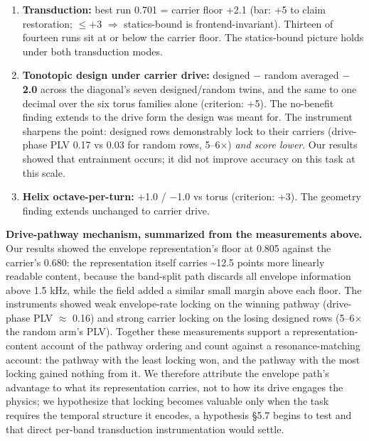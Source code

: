 \documentclass[10pt]{article}
\providecommand{\tightlist}{%
  \setlength{\itemsep}{0pt}\setlength{\parskip}{0pt}}
\begin{document}
\begin{enumerate}
\def\labelenumi{\arabic{enumi}.}
\tightlist
\item
  \textbf{Transduction:} best run 0.701 = carrier floor +2.1 (bar: +5 to
  claim restoration; \ensuremath{\leq}+3 \ensuremath{\Rightarrow}
  statics-bound is frontend-invariant). Thirteen of fourteen runs sit at
  or below the carrier floor. The statics-bound picture holds under both
  transduction modes.
\item
  \textbf{Tonotopic design under carrier drive:} designed \ensuremath{-}
  random averaged \textbf{\ensuremath{-}2.0} across the diagonal's seven
  designed/random twins, and the same to one decimal over the six torus
  families alone (criterion: +5). The no-benefit finding extends to the
  drive form the design was meant for. The instrument sharpens the
  point: designed rows demonstrably lock to their carriers (drive-phase
  PLV 0.17 vs 0.03 for random rows, 5--6\ensuremath{\times}) \emph{and
  score lower}. Our results showed that entrainment occurs; it did not
  improve accuracy on this task at this scale.
\item
  \textbf{Helix octave-per-turn:} +1.0 / \ensuremath{-}1.0 vs torus
  (criterion: +3). The geometry finding extends unchanged to carrier
  drive.
\end{enumerate}

\textbf{Drive-pathway mechanism, summarized from the measurements
above.} Our results showed the envelope representation's floor at 0.805
against the carrier's 0.680: the representation itself carries
\textasciitilde12.5 points more linearly readable content, because the
band-split path discards all envelope information above 1.5 kHz, while
the field added a similar small margin above each floor. The instruments
showed weak envelope-rate locking on the winning pathway (drive-phase
PLV \ensuremath{\approx} 0.16) and strong carrier locking on the losing
designed rows (5--6\ensuremath{\times} the random arm's PLV). Together
these measurements support a representation-content account of the
pathway ordering and count against a resonance-matching account: the
pathway with the least locking won, and the pathway with the most
locking gained nothing from it. We therefore attribute the envelope
path's advantage to what its representation carries, not to how its
drive engages the physics; we hypothesize that locking becomes valuable
only when the task requires the temporal structure it encodes, a
hypothesis §5.7 begins to test and that direct per-band transduction
instrumentation would settle.
\end{document}
